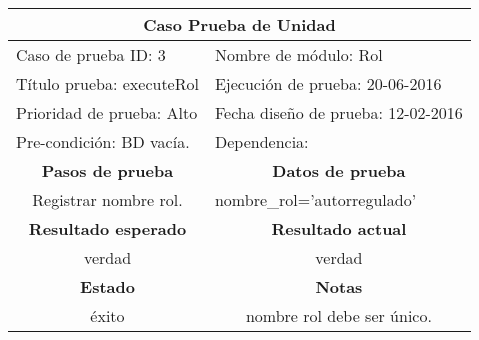 \begin{itemize}
\begin{table}[!ht]\centering
\begin{tabular}{|c|c|}
\hline
\multicolumn{2}{|c|}{\textbf{Caso Prueba de Unidad}} \\ \hline
\multicolumn{1}{|l|}{Caso de prueba ID: 3} & \multicolumn{1}{l|}{Nombre de módulo: Rol} \\ \hline
\multicolumn{1}{|l|}{Título prueba: executeRol} & \multicolumn{1}{l|}{Ejecución de prueba: 20-06-2016} \\ \hline
\multicolumn{1}{|l|}{Prioridad de prueba: Alto} & \multicolumn{1}{l|}{Fecha diseño de prueba: 12-02-2016} \\ \hline
\multicolumn{1}{|l|}{Pre-condición: BD vacía.} & \multicolumn{1}{l|}{Dependencia:} \\ \hline
\textbf{Pasos de prueba} & \textbf{Datos de prueba} \\ \hline
Registrar nombre rol. & \multicolumn{1}{l|}{nombre\_rol='autorregulado'} \\ \hline
\textbf{Resultado esperado} & \textbf{Resultado actual} \\ \hline
verdad & verdad \\ \hline
\textbf{Estado} & \textbf{Notas} \\ \hline
éxito & nombre rol debe ser único. \\ \hline
\end{tabular}
\label{Reporte prueba 3}
\end{table}


\end{itemize}
